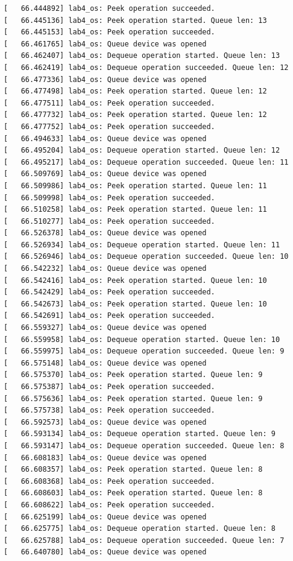 \documentclass[a4paper,14pt]{extarticle}
\begin{document}
\begin{verbatim}
[   66.444892] lab4_os: Peek operation succeeded.
[   66.445136] lab4_os: Peek operation started. Queue len: 13
[   66.445153] lab4_os: Peek operation succeeded.
[   66.461765] lab4_os: Queue device was opened
[   66.462407] lab4_os: Dequeue operation started. Queue len: 13
[   66.462419] lab4_os: Dequeue operation succeeded. Queue len: 12
[   66.477336] lab4_os: Queue device was opened
[   66.477498] lab4_os: Peek operation started. Queue len: 12
[   66.477511] lab4_os: Peek operation succeeded.
[   66.477732] lab4_os: Peek operation started. Queue len: 12
[   66.477752] lab4_os: Peek operation succeeded.
[   66.494633] lab4_os: Queue device was opened
[   66.495204] lab4_os: Dequeue operation started. Queue len: 12
[   66.495217] lab4_os: Dequeue operation succeeded. Queue len: 11
[   66.509769] lab4_os: Queue device was opened
[   66.509986] lab4_os: Peek operation started. Queue len: 11
[   66.509998] lab4_os: Peek operation succeeded.
[   66.510258] lab4_os: Peek operation started. Queue len: 11
[   66.510277] lab4_os: Peek operation succeeded.
[   66.526378] lab4_os: Queue device was opened
[   66.526934] lab4_os: Dequeue operation started. Queue len: 11
[   66.526946] lab4_os: Dequeue operation succeeded. Queue len: 10
[   66.542232] lab4_os: Queue device was opened
[   66.542416] lab4_os: Peek operation started. Queue len: 10
[   66.542429] lab4_os: Peek operation succeeded.
[   66.542673] lab4_os: Peek operation started. Queue len: 10
[   66.542691] lab4_os: Peek operation succeeded.
[   66.559327] lab4_os: Queue device was opened
[   66.559958] lab4_os: Dequeue operation started. Queue len: 10
[   66.559975] lab4_os: Dequeue operation succeeded. Queue len: 9
[   66.575148] lab4_os: Queue device was opened
[   66.575370] lab4_os: Peek operation started. Queue len: 9
[   66.575387] lab4_os: Peek operation succeeded.
[   66.575636] lab4_os: Peek operation started. Queue len: 9
[   66.575738] lab4_os: Peek operation succeeded.
[   66.592573] lab4_os: Queue device was opened
[   66.593134] lab4_os: Dequeue operation started. Queue len: 9
[   66.593147] lab4_os: Dequeue operation succeeded. Queue len: 8
[   66.608183] lab4_os: Queue device was opened
[   66.608357] lab4_os: Peek operation started. Queue len: 8
[   66.608368] lab4_os: Peek operation succeeded.
[   66.608603] lab4_os: Peek operation started. Queue len: 8
[   66.608622] lab4_os: Peek operation succeeded.
[   66.625199] lab4_os: Queue device was opened
[   66.625775] lab4_os: Dequeue operation started. Queue len: 8
[   66.625788] lab4_os: Dequeue operation succeeded. Queue len: 7
[   66.640780] lab4_os: Queue device was opened

\end{verbatim}
\end{document}
